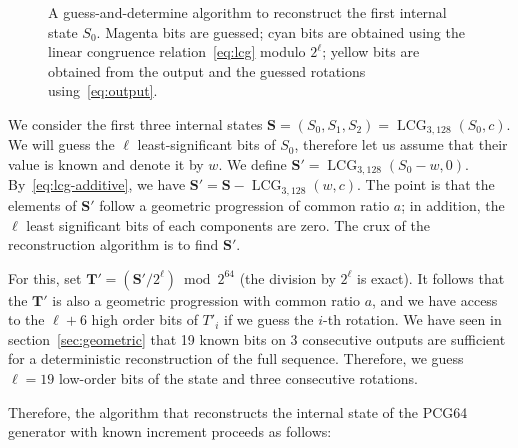 \documentclass[preprint,svgnames]{iacrtrans}
\DeclareMathOperator{\LCG}{LCG}
\begin{document}
\begin{figure}
\begin{center}
\end{center}
\caption{A guess-and-determine algorithm to reconstruct the first internal state
  $S_0$. Magenta bits are guessed; cyan bits are obtained using the linear
  congruence relation~\eqref{eq:lcg} modulo $2^\ell$; yellow bits are obtained
  from the output and the guessed rotations using~\eqref{eq:output}.}
\label{fig:Cknown}
\end{figure}

We consider the first three internal states
$\mathbf{S} = (S_0, S_1, S_2) = \LCG_{3, 128}(S_0, c)$. We will guess the $\ell$
least-significant bits of $S_0$, therefore let us assume that their value is
known and denote it by $w$. We define $\mathbf{S}' = \LCG_{3, 128}(S_0 - w,
0)$. By~\eqref{eq:lcg-additive}, we have
$\mathbf{S}' = \mathbf{S} - \LCG_{3, 128}(w, c)$. The point is that the elements
of $\mathbf{S}'$ follow a geometric progression of common ratio $a$; in
addition, the $\ell$ least significant bits of each components are zero. The
crux of the reconstruction algorithm is to find $\mathbf{S}'$.

For this, set $\mathbf{T}' = \left(\mathbf{S}' / 2^\ell\right) \bmod 2^{64}$
(the division by $2^\ell$ is exact). It follows that the $\mathbf{T}'$ is also a
geometric progression with common ratio $a$, and we have access to the $\ell+6$
high order bits of $T'_i$ if we guess the $i$-th rotation. We have seen in
section~\ref{sec:geometric} that 19 known bits on 3 consecutive outputs are
sufficient for a deterministic reconstruction of the full sequence. Therefore,
we guess $\ell = 19$ low-order bits of the state and three consecutive
rotations.

Therefore, the algorithm that reconstructs the internal state of the
\textsf{PCG64} generator with known increment proceeds as follows:
\end{document}
